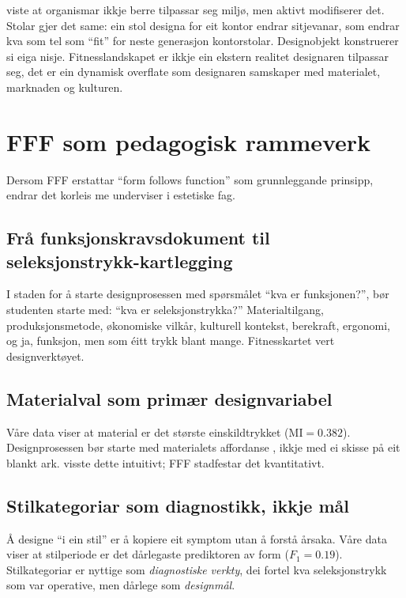 \documentclass[12pt,a4paper]{article}
\begin{document}
\citet{odlingsmee2003} viste at organismar ikkje berre tilpassar seg milj\o{}, men aktivt modifiserer det. Stolar gjer det same: ein stol designa for eit kontor endrar sitjevanar, som endrar kva som tel som \enquote{fit} for neste generasjon kontorstolar. Designobjekt konstruerer si eiga nisje. Fitnesslandskapet er ikkje ein ekstern realitet designaren tilpassar seg, det er ein dynamisk overflate som designaren samskaper med materialet, marknaden og kulturen.

\section{FFF som pedagogisk rammeverk}
\label{sec:pedagogikk}

Dersom FFF erstattar \enquote{form follows function} som grunnleggande prinsipp, endrar det korleis me underviser i estetiske fag.

\subsection{Fr\aa{} funksjonskravsdokument til seleksjonstrykk-kartlegging}

I staden for \aa{} starte designprosessen med sp\o{}rsm\aa{}let \enquote{kva er funksjonen?}, b\o{}r studenten starte med: \enquote{kva er seleksjonstrykka?} Materialtilgang, produksjonsmetode, \o{}konomiske vilk\aa{}r, kulturell kontekst, berekraft, ergonomi, og ja, funksjon, men som \'{e}itt trykk blant mange. Fitnesskartet vert designverkt\o{}yet.

\subsection{Materialval som prim\ae{}r designvariabel}

V\aa{}re data viser at material er det st\o{}rste einskildtrykket ($\mathrm{MI} = 0.382$). Designprosessen b\o{}r starte med materialets affordanse \citep{gibson1977, oxman2010}, ikkje med ei skisse p\aa{} eit blankt ark. \citet{pye1968} visste dette intuitivt; FFF stadfestar det kvantitativt.

\subsection{Stilkategoriar som diagnostikk, ikkje m\aa{}l}

\AA{} designe \enquote{i ein stil} er \aa{} kopiere eit symptom utan \aa{} forst\aa{} \aa{}rsaka. V\aa{}re data viser at stilperiode er det d\aa{}rlegaste prediktoren av form ($F_1 = 0.19$). Stilkategoriar er nyttige som \emph{diagnostiske verkty}, dei fortel kva seleksjonstrykk som var operative, men d\aa{}rlege som \emph{designm\aa{}l}.
\end{document}
